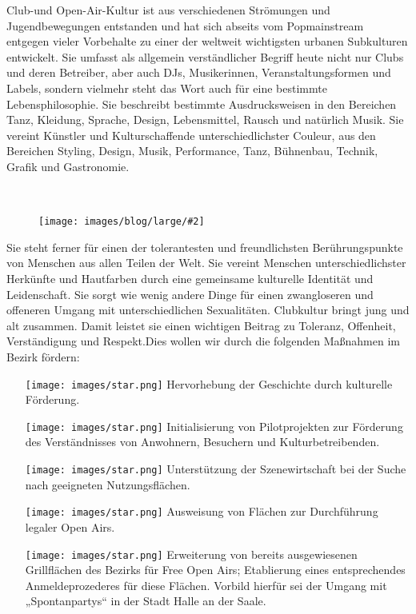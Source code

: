 \documentclass[a4paper,10pt]{article}
\newcommand{\mysection}[1]{{\vspace{1cm}\noindent\color{gray}{\ttfamily\LARGE\raggedright #1}\\\medskip}}
\newcommand{\abschnitt}[2]{%
\mysection{\raggedright #1}%
\begin{figure}[t]%
\vspace*{-2.7cm}%
\hspace*{-2.1cm}%
\texttt{[image: images/blog/large/\#2]} %
\end{figure}%
}
\begin{document}
\enlargethispage{2em}
Club-und Open-Air-Kultur ist aus verschiedenen Strömungen und
Jugendbewegungen entstanden und hat sich abseits vom Popmainstream
entgegen vieler Vorbehalte zu einer der weltweit wichtigsten urbanen
Subkulturen entwickelt. Sie umfasst als allgemein verständlicher Begriff
heute nicht nur Clubs und deren Betreiber, aber auch DJs, Musikerinnen,
Veranstaltungsformen und Labels, sondern vielmehr steht das Wort auch
für eine bestimmte Lebensphilosophie. Sie beschreibt bestimmte
Ausdrucksweisen in den Bereichen Tanz, Kleidung, Sprache, Design,
Lebensmittel, Rausch und natürlich Musik. Sie vereint Künstler und
Kulturschaffende unterschiedlichster Couleur, aus den Bereichen Styling,
Design, Musik, Performance, Tanz, Bühnenbau, Technik, Grafik und
Gastronomie.

\abschnitt{}{Deephouse.png}

Sie steht ferner für einen der tolerantesten und freundlichsten
Berührungspunkte von Menschen aus allen Teilen der Welt. Sie vereint
Menschen unterschiedlichster Herkünfte und Hautfarben durch eine
gemeinsame kulturelle Identität und Leidenschaft. Sie sorgt wie wenig
andere Dinge für einen zwangloseren und offeneren Umgang mit
unterschiedlichen Sexualitäten. Clubkultur bringt jung und alt zusammen.
Damit leistet sie einen wichtigen Beitrag zu Toleranz, Offenheit,
Verständigung und Respekt.Dies wollen wir durch die folgenden Maßnahmen
im Bezirk fördern:

\begin{itemize}
\itemsep1pt\parskip0pt
\item[\texttt{[image: images/star.png]}]
  Hervorhebung der Geschichte durch kulturelle Förderung.
\item[\texttt{[image: images/star.png]}]
  Initialisierung von Pilotprojekten zur Förderung des Verständnisses
  von Anwohnern, Besuchern und Kulturbetreibenden.
\item[\texttt{[image: images/star.png]}]
  Unterstützung der Szenewirtschaft bei der Suche nach geeigneten
  Nutzungsflächen.
\item[\texttt{[image: images/star.png]}]
  Ausweisung von Flächen zur Durchführung legaler Open Airs.
\item[\texttt{[image: images/star.png]}]
  Erweiterung von bereits ausgewiesenen Grillflächen des Bezirks für
  Free Open Airs; Etablierung eines entsprechendes Anmeldeprozederes für
  diese Flächen. Vorbild hierfür sei der Umgang mit „Spontanpartys`` in
  der Stadt Halle an der Saale.
\end{itemize}
\end{document}

